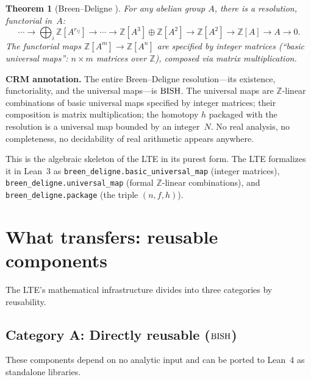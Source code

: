 \documentclass[11pt,a4paper]{article}
\theoremstyle{plain}
\newtheorem{theorem}{Theorem}[section]
\theoremstyle{definition}
\newcommand{\BISH}{\textup{BISH}}
\newcommand{\Z}{\mathbb{Z}}
\begin{document}
\begin{theorem}[Breen--Deligne {\cite{BreenDeligne}}]
For any abelian group $A$, there is a resolution, functorial in~$A$:
\[
  \cdots \longrightarrow \bigoplus_{i} \Z[A^{r_{ij}}]
  \longrightarrow \cdots
  \longrightarrow \Z[A^3] \oplus \Z[A^2]
  \longrightarrow \Z[A^2]
  \longrightarrow \Z[A]
  \longrightarrow A \longrightarrow 0.
\]
The functorial maps $\Z[A^m] \to \Z[A^n]$ are specified by
integer matrices (``basic universal maps'': $n \times m$ matrices
over $\Z$), composed via matrix multiplication.
\end{theorem}

\noindent\textbf{CRM annotation.}
The entire Breen--Deligne resolution---its existence, functoriality,
and the universal maps---is $\BISH$.  The universal maps are
$\Z$-linear combinations of basic universal maps specified by
integer matrices; their composition is matrix multiplication; the
homotopy $h$ packaged with the resolution is a universal map bounded
by an integer~$N$.  No real analysis, no completeness, no decidability
of real arithmetic appears anywhere.

This is the algebraic skeleton of the LTE in its purest form.
The LTE formalizes it in Lean~3 as
\texttt{breen\_deligne.basic\_universal\_map} (integer matrices),
\texttt{breen\_deligne.universal\_map} (formal $\Z$-linear
combinations), and \texttt{breen\_deligne.package} (the triple
$(n, f, h)$).

\section{What transfers: reusable components}\label{sec:reusable}

The LTE's mathematical infrastructure divides into three categories
by reusability.

\subsection{Category A: Directly reusable ($\BISH$)}

These components depend on no analytic input and can be ported to
Lean~4 as standalone libraries.
\end{document}
